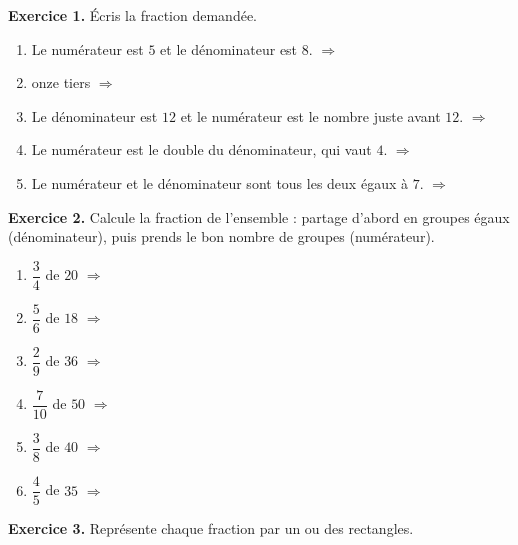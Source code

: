 

{\bfseries\color{themeColor}Exercice 1.} Écris la fraction demandée.

\begin{enumerate}[leftmargin=*,align=parleft, label=\alph*), itemsep=9pt]
\item Le numérateur est $5$ et le dénominateur est $8$. \quad $\Longrightarrow$
\item onze tiers \quad $\Longrightarrow$
\item Le dénominateur est $12$ et le numérateur est le nombre juste avant $12$. \quad $\Longrightarrow$
\item Le numérateur est le double du dénominateur, qui vaut $4$. \quad $\Longrightarrow$
\item Le numérateur et le dénominateur sont tous les deux égaux à $7$. \quad $\Longrightarrow$
\end{enumerate}

\vfill
{\bfseries\color{themeColor}Exercice 2.} Calcule la fraction de l'ensemble : partage d'abord en groupes égaux (dénominateur), puis prends le bon nombre de groupes (numérateur).

\begin{enumerate}[leftmargin=*,align=parleft, label=\alph*), itemsep=30pt]
\item $\dfrac{3}{4}$ de $20$ \quad $\Longrightarrow$
\item $\dfrac{5}{6}$ de $18$ \quad $\Longrightarrow$
\item $\dfrac{2}{9}$ de $36$ \quad $\Longrightarrow$
\item $\dfrac{7}{10}$ de $50$ \quad $\Longrightarrow$
\item $\dfrac{3}{8}$ de $40$ \quad $\Longrightarrow$
\item $\dfrac{4}{5}$ de $35$ \quad $\Longrightarrow$
\end{enumerate}


\newpage
{\bfseries\color{themeColor}Exercice 3.} Représente chaque fraction par un ou des rectangles.

